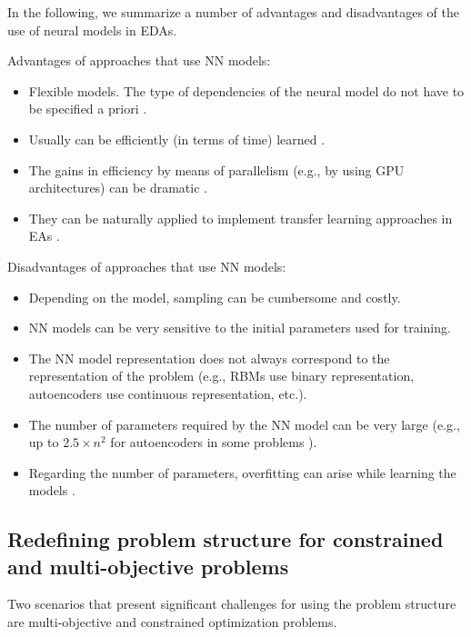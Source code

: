 \documentclass{article} %
\begin{document}
In the following, we summarize a number of advantages and disadvantages of the use of neural models in EDAs. 


Advantages of approaches that use NN models:

\begin{itemize}
 \item Flexible models. The type of dependencies of the neural model do not have to be specified a priori \cite{Baluja:2017}. 
 \item Usually can be efficiently (in terms of time) learned \cite{Churchill_et_al:2014,Probst:2015a}.  
 \item The gains in efficiency by means of parallelism (e.g., by using GPU architectures) can be dramatic \cite{Churchill_et_al:2016}. 
 \item They can be naturally applied to implement transfer learning approaches in EAs \cite{Churchill_et_al:2014}.
\end{itemize}

Disadvantages of approaches that use NN models:

\begin{itemize}
 \item Depending on the model, sampling can be cumbersome and costly. 
 \item NN models can be very sensitive to the initial parameters used for training. 
 \item The NN model representation does not always correspond to the representation of the problem (e.g., RBMs use binary representation, autoencoders use continuous representation, etc.). 
 \item The number of parameters required by the NN model can be very large (e.g., up to $2.5 \times n^2$ for autoencoders in some problems \cite{Churchill_et_al:2014}). 
 \item Regarding the number of parameters, overfitting can arise while learning the models \cite{Probst:2015a}. 
\end{itemize}




\subsection{Redefining problem structure for constrained and multi-objective problems}

 Two scenarios that present significant challenges for using the problem structure are multi-objective and constrained optimization problems.
\end{document}

